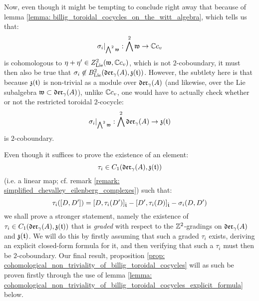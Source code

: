         Now, even though it might be tempting to conclude right away that because of lemma \ref{lemma: billig_toroidal_cocycles_on_the_witt_algebra}, which tells us that:
            $$\sigma_i|_{\bigwedge^2 \mathfrak{w}}: \bigwedge^2 \mathfrak{w} \to \mathbb{C} c_v$$
        is cohomologous to $\eta + \eta' \in Z^2_{\mathrm{Lie}}(\mathfrak{w}, \mathbb{C} c_v)$, which is not $2$-coboundary, it must then also be true that $\sigma_i \not \in B^2_{\mathrm{Lie}}(\mathfrak{der}_{\gamma}(A), \mathfrak{z}(\mathfrak{t}))$. However, the subtlety here is that because $\mathfrak{z}(\mathfrak{t})$ is non-trivial as a module over $\mathfrak{der}_{\gamma}(A)$ (and likewise, over the Lie subalgebra $\mathfrak{w} \subset \mathfrak{der}_{\gamma}(A)$), unlike $\mathbb{C} c_v$, one would have to actually check whether or not the restricted toroidal $2$-cocycle:
            $$\sigma_i|_{\bigwedge^2 \mathfrak{w}}: \bigwedge^2 \mathfrak{der}_{\gamma}(A) \to \mathfrak{z}(\mathfrak{t})$$
        is $2$-coboundary.

        Even though it suffices to prove the existence of an element:
            $$\tau_i \in C_1(\mathfrak{der}_{\gamma}(A), \mathfrak{z}(\mathfrak{t}))$$
        (i.e. a linear map; cf. remark \ref{remark: simplified_chevalley_eilenberg_complexes}) such that:
            $$\tau_i([D, D']) = [D, \tau_i(D')]_{\hat{\mathfrak{t}}} - [D', \tau_i(D)]_{\hat{\mathfrak{t}}} - \sigma_i(D, D')$$
        we shall prove a stronger statement, namely the existence of $\tau_i \in C_1(\mathfrak{der}_{\gamma}(A), \mathfrak{z}(\mathfrak{t}))$ that is \textit{graded} with respect to the $\mathbb{Z}^2$-gradings on $\mathfrak{der}_{\gamma}(A)$ and $\mathfrak{z}(\mathfrak{t})$. We will do this by firstly assuming that such a graded $\tau_i$ exists, deriving an explicit closed-form formula for it, and then verifying that such a $\tau_i$ must then be $2$-coboundary. Our final result, proposition \ref{prop: cohomological_non_triviality_of_billig_toroidal_cocycles} will as such be proven firstly through the use of lemma \ref{lemma: cohomological_non_triviality_of_billig_toroidal_cocycles_explicit_formula} below.

